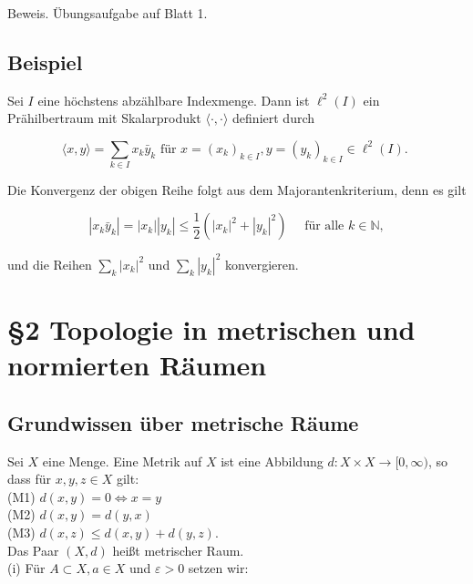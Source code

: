 \documentclass[10pt, letterpaper]{article}
\begin{document}
Beweis. Übungsaufgabe auf Blatt 1.

\subsection*{Beispiel}
Sei $I$ eine höchstens abzählbare Indexmenge. Dann ist $\ell^{2}(I)$ ein Prähilbertraum mit Skalarprodukt $\langle\cdot, \cdot\rangle$ definiert durch

$$
\langle x, y\rangle=\sum_{k \in I} x_{k} \bar{y}_{k} \text { für } x=\left(x_{k}\right)_{k \in I}, y=\left(y_{k}\right)_{k \in I} \in \ell^{2}(I) \text {. }
$$

Die Konvergenz der obigen Reihe folgt aus dem Majorantenkriterium, denn es gilt

$$
\left|x_{k} \bar{y}_{k}\right|=\left|x_{k}\right|\left|y_{k}\right| \leq \frac{1}{2}\left(\left|x_{k}\right|^{2}+\left|y_{k}\right|^{2}\right) \quad \text { für alle } k \in \mathbb{N},
$$

und die Reihen $\sum_{k}\left|x_{k}\right|^{2}$ und $\sum_{k}\left|y_{k}\right|^{2}$ konvergieren.

\section*{§2 Topologie in metrischen und normierten Räumen}
\subsection*{Grundwissen über metrische Räume}
Sei $X$ eine Menge. Eine Metrik auf $X$ ist eine Abbildung $d: X \times X \rightarrow[0, \infty)$, so dass für $x, y, z \in X$ gilt:\\
(M1) $d(x, y)=0 \Longleftrightarrow x=y$\\
(M2) $d(x, y)=d(y, x)$\\
(M3) $d(x, z) \leq d(x, y)+d(y, z)$.\\
Das Paar $(X, d)$ heißt metrischer Raum.\\
(i) Für $A \subset X, a \in X$ und $\varepsilon>0$ setzen wir:
\end{document}

